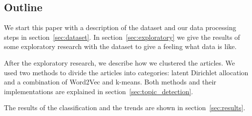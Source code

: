 \subsection{Outline}
We start this paper with a description of the dataset and our data processing steps in section~\ref{sec:dataset}. In section~\ref{sec:exploratory} we give the results of some exploratory research with the dataset to give a feeling what data is like.

After the exploratory research, we describe how we clustered the articles. We used two methods to divide the articles into categories: latent Dirichlet allocation and a combination of Word2Vec and k-means. Both methods and their implementations are explained in section~\ref{sec:topic_detection}. 

The results of the classification and the trends are shown in section~\ref{sec:results}.